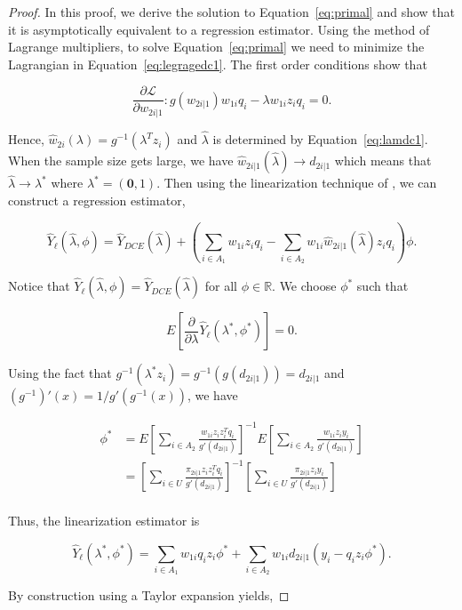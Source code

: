 \documentclass[12pt]{article}
\renewcommand{\bf}[1]{\mathbf{#1}}
\begin{document}
\begin{proof}
  In this proof, we derive the solution to Equation~\ref{eq:primal} and show
  that it is asymptotically equivalent to a regression estimator. Using the
  method of Lagrange multipliers, to solve Equation~\eqref{eq:primal} we need to
  minimize the Lagrangian in Equation~\eqref{eq:legragedc1}. 
  The first order conditions show that

  $$\frac{\partial \mathcal{L}}{\partial w_{2i|1}}: g(w_{2i|1}) w_{1i}q_i -
    \lambda w_{1i} z_i q_i = 0.$$

  Hence, $\hat w_{2i}(\lambda) = g^{-1}(\lambda^T z_i)$ and $\hat \lambda$ is
  determined by Equation~\eqref{eq:lamdc1}. When the sample size gets large, we
  have $\hat w_{2i|1}(\hat \lambda) \to d_{2i|1}$ which means that $\hat \lambda
  \to \lambda^*$ where $\lambda^* = (\bf 0, 1)$. Then using the linearization
  technique of \cite{randles1982asymptotic}, we can construct a regression
  estimator, 

  $$\hat Y_\ell(\hat \lambda, \phi)  = \hat Y_{DCE}(\hat \lambda) + 
  \left(\sum_{i \in A_1} w_{1i} z_i q_i - \sum_{i \in A_2} w_{1i} \hat w_{2i|1}(\hat
  \lambda) z_i q_i\right)\phi.$$

  Notice that $\hat Y_\ell(\hat \lambda, \phi) = \hat Y_{DCE}(\hat \lambda)$ for
  all $\phi \in \mathbb{R}$. We choose $\phi^*$ such that

  $$E\left[\frac{\partial}{\partial \lambda} \hat Y_\ell(\lambda^*, \phi^*)\right]=0.$$

  Using the fact that $g^{-1}(\lambda^* z_i) = g^{-1}(g(d_{2i|1})) = d_{2i|1}$
  and $(g^{-1})'(x) = 1 / g'(g^{-1}(x))$, we have

  \begin{align*}
    \phi^*
    &= E\left[\sum_{i \in A_2} \frac{w_{1i}z_i z_i^T q_i}{g'(d_{2i|1})}\right]^{-1}
    E\left[\sum_{i \in A_2} \frac{w_{1i}z_i y_i}{g'(d_{2i|1})}\right]\\
    &= \left[\sum_{i \in U} \frac{\pi_{2i|1}z_i z_i^T q_i}{g'(d_{2i|1})}\right]^{-1}
    \left[\sum_{i \in U} \frac{\pi_{2i|1} z_i y_i}{g'(d_{2i|1})}\right]\\
  \end{align*}

  Thus, the linearization estimator is

  $$\hat Y_\ell(\lambda^*, \phi^*) = \sum_{i \in A_1} w_{1i} q_i z_i \phi^* +
  \sum_{i \in A_2} w_{1i} d_{2i|1} (y_i - q_i z_i \phi^*).$$

  By construction using a Taylor expansion yields,


\end{proof}
\end{document}
